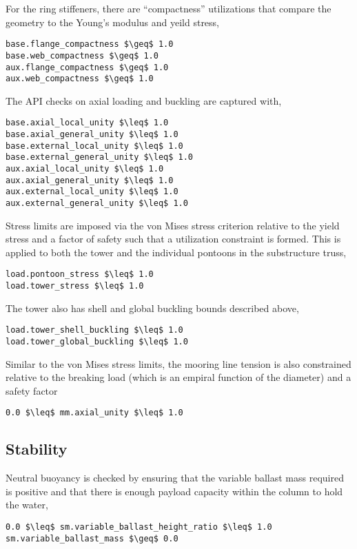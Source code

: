 For the ring stiffeners, there are ``compactness'' utilizations that
compare the geometry to the Young's modulus and yeild stress,
\begin{lstlisting}
base.flange_compactness $\geq$ 1.0
base.web_compactness $\geq$ 1.0
aux.flange_compactness $\geq$ 1.0
aux.web_compactness $\geq$ 1.0
\end{lstlisting}

The API checks on axial loading and buckling are captured with,
\begin{lstlisting}
base.axial_local_unity $\leq$ 1.0
base.axial_general_unity $\leq$ 1.0
base.external_local_unity $\leq$ 1.0
base.external_general_unity $\leq$ 1.0
aux.axial_local_unity $\leq$ 1.0
aux.axial_general_unity $\leq$ 1.0
aux.external_local_unity $\leq$ 1.0
aux.external_general_unity $\leq$ 1.0
\end{lstlisting}

Stress limits are imposed via the von Mises stress criterion relative to
the yield stress and a factor of safety such that a utilization
constraint is formed.  This is applied to both the tower and the
individual pontoons in the substructure truss,
\begin{lstlisting}
load.pontoon_stress $\leq$ 1.0
load.tower_stress $\leq$ 1.0
\end{lstlisting}

The tower also has shell and global buckling bounds described above,
\begin{lstlisting}
load.tower_shell_buckling $\leq$ 1.0
load.tower_global_buckling $\leq$ 1.0
\end{lstlisting}

Similar to the von Mises stress limits, the mooring line tension is also
constrained relative to the breaking load (which is an empiral function of
the diameter) and a safety factor
\begin{lstlisting}
0.0 $\leq$ mm.axial_unity $\leq$ 1.0
\end{lstlisting}
            
\subsection{Stability}
Neutral buoyancy is checked by ensuring that the variable ballast mass
required is positive and that there is enough payload capacity within
the column to hold the water,
\begin{lstlisting}
0.0 $\leq$ sm.variable_ballast_height_ratio $\leq$ 1.0
sm.variable_ballast_mass $\geq$ 0.0
\end{lstlisting}

